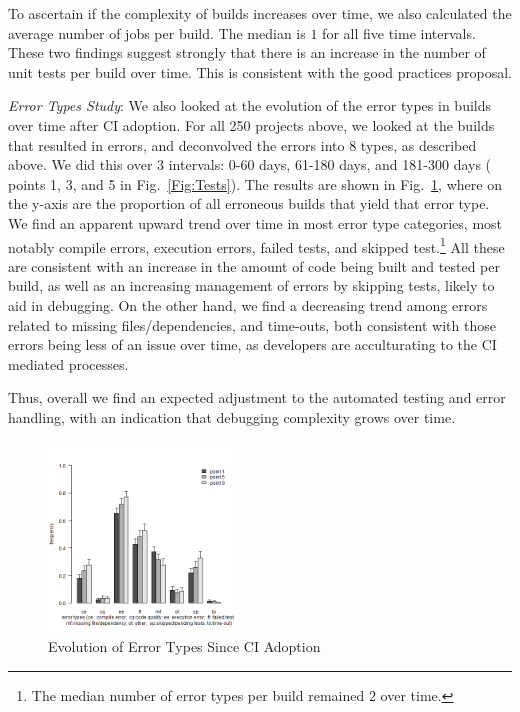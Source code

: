 To ascertain if the complexity of builds increases over time, we also calculated 
the average number of jobs per build.
The median is $1$ for all five time intervals.
These two findings suggest strongly that there is an increase in the number of 
unit tests per build over time.
This is consistent with the good practices proposal.


\smallskip\noindent \emph{Error Types Study}:
We also looked at the evolution of the error types in builds over time after CI 
adoption.
For all 250 projects above, we looked at the builds that resulted in errors, 
and deconvolved the errors into 8 types, as described above.
We did this over 3 intervals: 0-60 days, 61-180 days, and 181-300 days (\ie 
points 1, 3, and  5 in Fig.~\ref{Fig:Tests}).
The results are shown in Fig.~\ref{Fig:BugTypes}, where on the y-axis are 
the proportion of all erroneous builds that yield that error type.
We find an apparent upward trend over time in most error type categories, 
most notably compile errors, execution errors, failed tests, and skipped 
test.\footnote{The median number of error types per build remained $2$ over 
time.}
All these are consistent with an increase in the amount of code being built 
and tested per build, as well as an increasing management of errors by 
skipping tests, likely to aid in debugging.
On the other hand, we find a decreasing trend among errors related to missing 
files/dependencies, and time-outs, both consistent with those errors being less 
of an issue over time, as developers are acculturating to the CI mediated 
processes.

Thus, overall we find an expected adjustment to the automated testing and 
error handling, with an indication that debugging complexity grows over time.

\begin{figure}[!t]
\centering
\includegraphics[width=0.45\textwidth, clip=true, trim=0 15 15 50]{plot_together.png}
\caption{Evolution of Error Types Since CI Adoption}
\label{Fig:BugTypes}
\end{figure}




